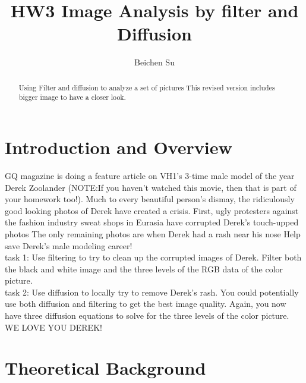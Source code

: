 \documentclass[12pt,letterpaper]{article}
\begin{document}
\title{HW3 Image Analysis by filter and Diffusion}
\author{Beichen Su}
\maketitle

\begin{abstract}
Using Filter and diffusion to analyze a set of pictures
This revised version includes bigger image to have a closer look.
\end{abstract}

\newpage
\section{Introduction and Overview}
GQ magazine is doing a feature article on VH1’s 3-time male model of the year Derek Zoolander (NOTE:If you haven’t watched this movie, then that is part of your homework too!). Much to every beautiful person’s dismay, the ridiculously good looking photos of Derek have created a crisis. First, ugly protesters against the fashion industry sweat shops in Eurasia have corrupted Derek’s touch-upped photos The only remaining photos are when Derek had a rash near his nose 
Help save Derek’s male modeling career!\\
task 1: Use filtering to try to clean up the corrupted images of Derek. Filter both the black and white image and the three levels of the RGB data of the color picture.\\
task 2: Use diffusion to locally try to remove Derek’s rash. You could potentially use both diffusion and filtering to get the best image quality. Again, you now have three diffusion equations to solve for the three levels of the color picture.\\
WE LOVE YOU DEREK!
\newline 




\section{Theoretical Background}
\end{document}
